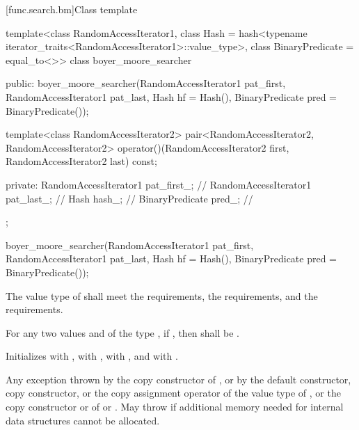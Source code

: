 [func.search.bm]{Class template }

%
\begin{codeblock}
template<class RandomAccessIterator1,
         class Hash = hash<typename iterator_traits<RandomAccessIterator1>::value_type>,
         class BinaryPredicate = equal_to<>>
  class boyer_moore_searcher {
  public:
    boyer_moore_searcher(RandomAccessIterator1 pat_first,
                         RandomAccessIterator1 pat_last,
                         Hash hf = Hash(),
                         BinaryPredicate pred = BinaryPredicate());

    template<class RandomAccessIterator2>
      pair<RandomAccessIterator2, RandomAccessIterator2>
        operator()(RandomAccessIterator2 first, RandomAccessIterator2 last) const;

  private:
    RandomAccessIterator1 pat_first_;   // \expos
    RandomAccessIterator1 pat_last_;    // \expos
    Hash hash_;                         // \expos
    BinaryPredicate pred_;              // \expos
  };
\end{codeblock}

%
\begin{itemdecl}
boyer_moore_searcher(RandomAccessIterator1 pat_first,
                     RandomAccessIterator1 pat_last,
                     Hash hf = Hash(),
                     BinaryPredicate pred = BinaryPredicate());
\end{itemdecl}

\begin{itemdescr}
\pnum
\requires
The value type of  shall meet the  requirements,
the  requirements, and the  requirements.

\pnum
\requires
For any two values  and  of the type ,
if , then  shall be .

\pnum
\effects
Initializes
 with ,
 with ,
 with , and
 with .

\pnum
\throws
Any exception thrown by the copy constructor of ,
or by the default constructor, copy constructor, or the copy assignment operator of the value type of ,
or the copy constructor or  of  or .
May throw  if additional memory needed for internal data structures cannot be allocated.
\end{itemdescr}

